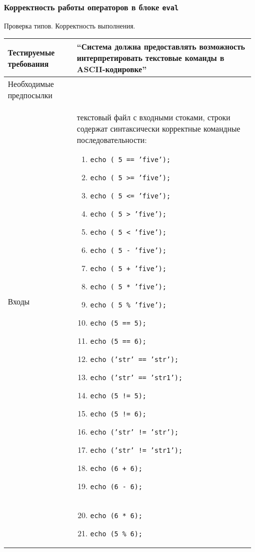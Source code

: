 \documentclass[a4paper, 12pt]{article}
\begin{document}
\subsubsection{Корректность работы операторов в блоке {\tt eval}} %
Проверка типов. Корректность выполнения.

\begin{longtable}[H]{|l|p{4in}|}
		\hline
		Тестируемые требования	&``Система должна предоставлять возможность интерпретировать текстовые
		команды в ASCII-кодировке''\\
		\hline
		Необходимые предпосылки	&\\
		\hline
		Входы			&текстовый файл с входными стоками,\newline
		строки содержат синтаксически корректные командные последовательности:
		\begin{enumerate}
			\item {\tt echo ( 5 == 'five');}
			\item {\tt echo ( 5 >= 'five');}
			\item {\tt echo ( 5 <= 'five');}
			\item {\tt echo ( 5 > 'five');}
			\item {\tt echo ( 5 < 'five');}
			\item {\tt echo ( 5 - 'five');}
			\item {\tt echo ( 5 + 'five');}
			\item {\tt echo ( 5 * 'five');}
			\item {\tt echo ( 5 \% 'five');}
			\item {\tt echo (5 == 5);}
			\item {\tt echo (5 == 6);}
			\item {\tt echo ('str' == 'str');}
			\item {\tt echo ('str' == 'str1');}
			\item {\tt echo (5 != 5);}
			\item {\tt echo (5 != 6);}
			\item {\tt echo ('str' != 'str');}
			\item {\tt echo ('str' != 'str1');}
			\item {\tt echo (6 + 6);}
			\item {\tt echo (6 - 6);}
		\end{enumerate}\\&
				\begin{enumerate}
						\setcounter{enumi}{19}
			\item {\tt echo (6 * 6);}
			\item {\tt echo (5 \% 6);}

\end{enumerate}
\end{longtable}
\end{document}
